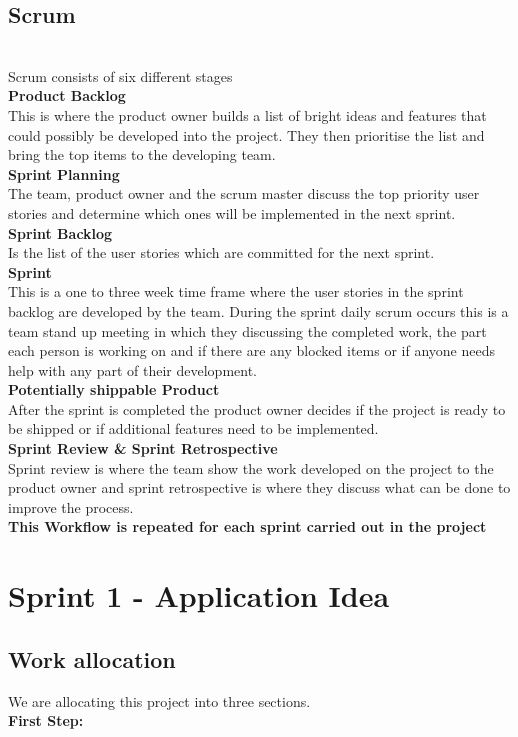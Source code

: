 \documentclass[a4paper,12pt]{report}
\begin{document}
\subsection{Scrum }\\
Scrum consists of six different stages\\ 
\textbf{Product Backlog}\\
This is where the product owner builds a list of bright ideas and features that could possibly be developed into the project.
They then prioritise the list and bring the top items to the developing team.\\
\textbf{Sprint Planning}\\
The team, product owner and the scrum master discuss the top priority user stories and determine which ones will be implemented in the next sprint.\\
\textbf{Sprint Backlog}\\
Is the list of the user stories which are committed for the next sprint.\\
\textbf{Sprint}\\
This is a one to three week time frame where the user stories in the sprint backlog are developed by the team. During the sprint daily scrum occurs this is a team stand up meeting in which they discussing the completed work, the part each person is working on and if there are any blocked items or if anyone needs help with any part of their development.\\
\textbf{Potentially shippable Product}\\
After the sprint is completed the product owner decides if the project is ready to be shipped or if additional features need to be implemented.\\
\textbf{Sprint Review \& Sprint Retrospective}\\
Sprint review is where the team show the work developed on the project to the product owner and sprint retrospective is where they discuss what can be done to improve the process.\\
\textbf{This Workflow is repeated for each sprint carried out in the project}
\section{Sprint 1 - Application Idea}

\subsection{Work allocation}
We are allocating this project into three sections.\\
\textbf{First Step:}
\end{document}
